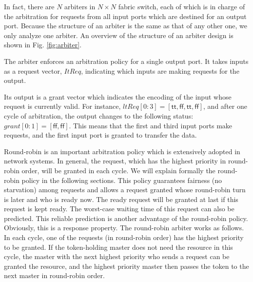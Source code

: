 \documentclass[final]{IEEEtran}
\begin{document}
In fact, there are $N$ arbiters in $N \times N$ fabric switch,
each of which is in charge of the arbitration for requests from all
input ports which are destined for an output port. Because the
structure of an arbiter is the same as that of any other one,  we
only analyze one arbiter. An overview of the structure of an
arbiter design is shown in Fig. \ref{fig:arbiter}.

The arbiter enforces an arbitration policy for a single output port.
It takes inputs as a request vector, $ItReq$, indicating which inputs
are making requests for the output. %

Its output is a grant vector which indicates the encoding of the
input whose request is currently valid. %
For instance,
$ltReq[0:3]=[\mathsf{tt},\mathsf{ff},\mathsf{tt},\mathsf{ff}]$, and after
one cycle of arbitration, the output changes to the following
status: %
$grant[0:1]=[\mathsf{ff},\mathsf{ff}]$. This means that the first and
third input ports  make requests, and the first input port is
granted to transfer the data.

Round-robin is an important arbitration policy which is extensively
adopted in network systems. In general, the request, which has the
highest priority in round-robin order, will be granted in each
cycle.  We will explain formally the round-robin policy in the following
sections. This policy guarantees fairness (no starvation) among
requests and allows a request granted whose round-robin turn is
later and who is ready now. The ready request will be granted at
last if this request is kept ready.  The worst-case waiting time of
this
request can also be predicted. %
This reliable prediction is another advantage of the round-robin policy. %
 Obviously, this is a response property. %
The round-robin arbiter works as follows. In
each cycle, one of the requests (in round-robin order) has the
highest priority to be granted. If the token-holding master does not
need the resource in this cycle, the master with the next highest
priority who sends a request can be granted the resource, and the
highest priority master then passes the token to the next master in
round-robin order.
\end{document}
